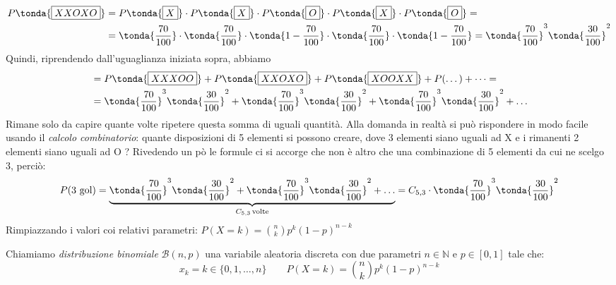 \begin{esempio}
\[\begin{split}P\tonda{\text{\boxed{XXOXO}}} &= P\tonda{\text{\boxed{X}}} \cdot P\tonda{\text{\boxed{X}}} \cdot P\tonda{\text{\boxed{O}}}  \cdot P\tonda{\text{\boxed{X}}} \cdot P\tonda{\text{\boxed{O}}}=\\ &= \tonda{\dfrac{70}{100}} \cdot  \tonda{\dfrac{70}{100}} \cdot  \tonda{1-\dfrac{70}{100}}  \cdot  \tonda{\dfrac{70}{100}} \cdot \tonda{ 1-\dfrac{70}{100}} =\tonda{\dfrac{70}{100}}^3 \tonda{\dfrac{30}{100}}^2 \end{split}\]
Quindi, riprendendo dall'uguaglianza iniziata sopra, abbiamo
\[\begin{split}&= P\tonda{\text{\boxed{XXXOO}}}+P\tonda{\text{\boxed{XXOXO}}}+P\tonda{\text{\boxed{XOOXX}}}+ P(\dots)+\dots = \\ &= \tonda{\dfrac{70}{100}}^3 \tonda{\dfrac{30}{100}}^2+\tonda{\dfrac{70}{100}}^3 \tonda{\dfrac{30}{100}}^2+\tonda{\dfrac{70}{100}}^3 \tonda{\dfrac{30}{100}}^2+\dots \end{split}\]
Rimane solo da capire quante volte ripetere questa somma di uguali quantità. Alla domanda in realtà si può rispondere in modo facile usando il \emph{calcolo combinatorio}: quante disposizioni di 5 elementi si possono creare, dove 3 elementi siano uguali ad X e i rimanenti 2 elementi siano uguali ad O ? Rivedendo un pò le formule ci si accorge che non è altro che una combinazione di 5 elementi da cui ne scelgo 3, perciò:
\[P(\text{3 gol}) = \underbrace{ \tonda{\dfrac{70}{100}}^3 \tonda{\dfrac{30}{100}}^2+\tonda{\dfrac{70}{100}}^3 \tonda{\dfrac{30}{100}}^2+ \dots}_{C_{5,3} \,\text{volte}} = C_{5,3} \cdot \tonda{\dfrac{70}{100}}^3 \tonda{\dfrac{30}{100}}^2\]
Rimpiazzando i valori coi relativi parametri: \quad \( \displaystyle P(X=k)= \binom{n}{k} p^k (1-p)^{n-k}\)\end{esempio}


\begin{definizione} Chiamiamo \emph{distribuzione binomiale} \(\mathcal{B}(n,p)\) una variabile aleatoria discreta con due parametri \(n \in \mathbb{N}\) e \(p \in [0,1]\) tale che:
\[ x_k = k \in \{0,1,\dots,n\} \qquad P(X=k)= \binom{n}{k} p^k (1-p)^{n-k}\]
\end{definizione}


